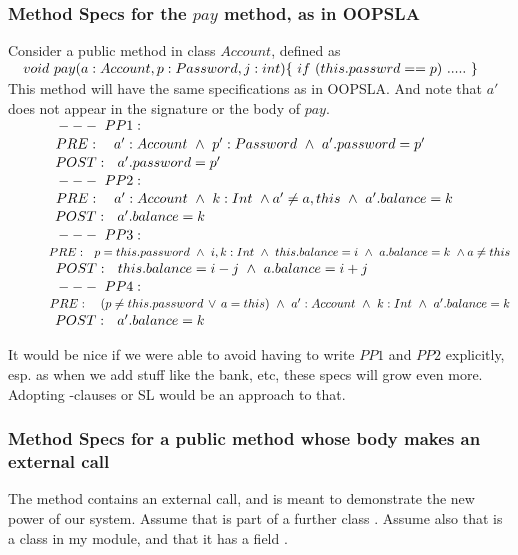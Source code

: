 \subsubsection{Method Specs for the $pay$ method, as in OOPSLA}

\newcommand{\SP}{~\strut \ \ \ \ \ \ \ \ \ }
Consider a public method in class $Account$, defined as \\
$\strut \ \ \  void\  pay(a: Account, p:Password, j: int)\{ \ if\ ( this.passwrd== p)\ .....\  \}$
\\
This method will have the same specifications as in OOPSLA. And note that $a'$ does not appear in the signature or the body of $pay$.  \\ 
$\SP---\ PP1:$\\
$\SP PRE:\ \ \ a': Account \ \wedge \  p' : Password \ \wedge \ a'.password=p' $
\\
$\SP POST: \ \ a'.password=p' $
\\
$\SP ---\ PP2:$\\
$\SP PRE:\ \ \ a':Account \ \wedge\ k: Int \ \wedge  a'\neq a, this\ \wedge\  a'.balance = k \ \ $\\
$\SP POST:\ \   a'.balance = k \ \ $
\\
$\SP ---\ PP3:$ \\
$\SP PRE: \ \ p=this.password \ \wedge\ i,k:Int \ \wedge \ this.balance=i \ \wedge \ a.balance=k\ \wedge a\neq this$
\\
$\SP POST:\ \  this.balance=i-j \ \wedge\  a.balance = i+j \ \ $\\
$\SP ---\ PP4:$\\
$\SP PRE:\ \ \ ( p\neq this.password\, \vee\, a=this)\  \wedge \  a':Account \ \wedge\ k: Int\   \wedge\  a'.balance = k $\\
$\SP POST: \ \ a'.balance=k$

It would be nice if we were able to avoid having to write $PP1$ and $PP2$ explicitly, esp. as when we add stuff like the bank, etc, these specs will grow even more. Adopting -clauses or SL would be an approach to that.


\subsubsection{Method Specs for a public method whose body makes an external call}
 The method  contains an external call, and is meant to demonstrate the new power of our system. Assume that 
 is part of a further class .   Assume also that  is a class in my module, and that it has a field .
 
